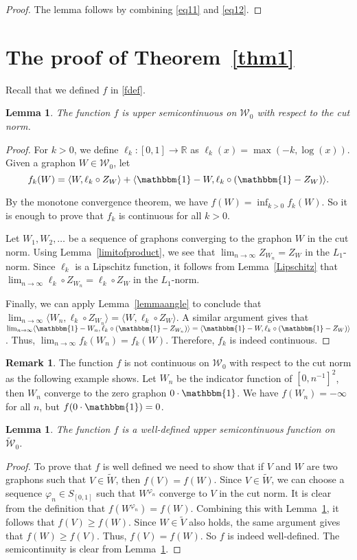 \documentclass[11pt,a4paper]{article}
\theoremstyle{plain}
\newtheorem{lemma}[theorem]{Lemma}
\theoremstyle{definition}
\newtheorem{remark}[theorem]{Remark}
\begin{document}
\begin{proof}
The lemma follows by combining \eqref{eq11} and \eqref{eq12}. 
\end{proof}
\section{The proof of Theorem~\ref{thm1}}
Recall that we defined $f$ in \eqref{fdef}.

\begin{lemma}\label{semic0}
The function $f$ is upper semicontinuous on $\mathcal{W}_0$ with respect to the cut norm.
\end{lemma}
\begin{proof}
For $k>0$, we define $\ell_k:[0,1]\to \mathbb{R}$ as $\ell_k(x)=\max(-k,\log(x))$. Given a graphon $W\in \mathcal{W}_0$, let
\[f_k(W)=\langle W, \ell_k\circ Z_W\rangle+\langle \mathbbm{1}-W, \ell_k\circ(\mathbbm{1}- Z_W)\rangle.\]

By the monotone convergence theorem, we have $f(W)=\inf_{k>0} f_k(W)$. So it is enough to prove that $f_k$ is continuous for all $k>0$. 

Let $W_1,W_2,\dots$ be a sequence of graphons converging to the graphon $W$ in the cut norm. Using Lemma~\ref{limitofproduct}, we see that $\lim_{n\to\infty} Z_{W_n}=Z_W$ in the $L_1$-norm. Since $\ell_k$ is a Lipschitz function, it follows from Lemma~\ref{Lipschitz} that  $\lim_{n\to\infty}\ell_k\circ Z_{W_n}=\ell_k\circ Z_W$  in the $L_1$-norm. 

Finally, we can apply Lemma~\ref{lemmaangle} to conclude that $\lim_{n\to\infty}\langle W_n, \ell_k\circ Z_{W_n}\rangle=\langle W, \ell_k\circ Z_W\rangle$. A similar argument gives that $\lim_{n\to\infty}\langle \mathbbm{1}-W_n, \ell_k\circ(\mathbbm{1}- Z_{W_n})\rangle=\langle \mathbbm{1}-W, \ell_k\circ(\mathbbm{1}- Z_W)\rangle$. Thus, $\lim_{n\to\infty} f_k(W_n)=f_k(W)$. Therefore, $f_k$ is indeed continuous.
\end{proof}

\begin{remark} The function $f$ is not continuous on $\mathcal{W}_0$ with respect to the cut norm as the following example shows. Let $W_n$ be the indicator function of $[0,n^{-1}]^2$, then $W_n$ converge to the zero graphon $0\cdot \mathbbm{1}$. We have $f(W_n)=-\infty$ for all $n$, but $f(0\cdot \mathbbm{1})=0$. 
\end{remark}
\begin{lemma}\label{semic}
The function $f$ is a well-defined upper semicontinuous function on $\widetilde{\mathcal{W}}_0$.
\end{lemma}
\begin{proof}
To prove that $f$ is well defined we need to show that if $V$ and $W$ are two graphons such that $V\in \widetilde{W}$, then $f(V)=f(W)$. Since $V\in \widetilde{W}$, we can choose a sequence $\varphi_n\in S_{[0,1]}$ such that $W^{\varphi_n}$ converge to $V$ in the cut norm. It is clear from the definition that $f(W^{\varphi_n})=f(W)$. Combining this with Lemma~\ref{semic0}, it follows that $f(V)\ge f(W)$. Since $W\in \widetilde{V}$ also holds, the same argument gives that $f(W)\ge f(V)$. Thus, $f(V)=f(W)$. So $f$ is indeed well-defined. The semicontinuity is clear from Lemma~\ref{semic0}.  
\end{proof}
\end{document}
